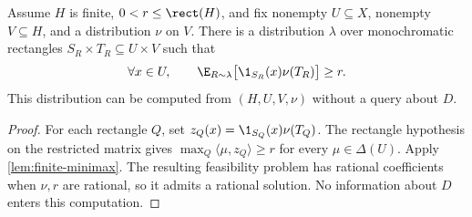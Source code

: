 \begin{lemma}\label{lem:mixture}
Assume $H$ is finite, $0<r\le\rect(H)$, and fix nonempty $U\subseteq X$, nonempty $V\subseteq H$, and a distribution $\nu$ on $V$. There is a distribution $\lambda$ over monochromatic rectangles $S_R\times T_R\subseteq U\times V$ such that
\begin{equation}\label{eq:coverage}
 \forall x\in U,\qquad
 \E_{R\sim\lambda}\bigl[\1_{S_R}(x)\nu(T_R)\bigr]\ge r.
\end{equation}
This distribution can be computed from $(H,U,V,\nu)$ without a query about $D$.
\end{lemma}

\begin{proof}
For each rectangle $Q$, set $z_Q(x)=\1_{S_Q}(x)\nu(T_Q)$. The rectangle hypothesis on the restricted matrix gives
$\max_Q\langle\mu,z_Q\rangle\ge r$ for every $\mu\in\Delta(U)$.
Apply \cref{lem:finite-minimax}. The resulting feasibility problem has rational coefficients when $\nu,r$ are rational, so it admits a rational solution. No information about $D$ enters this computation.
\end{proof}
